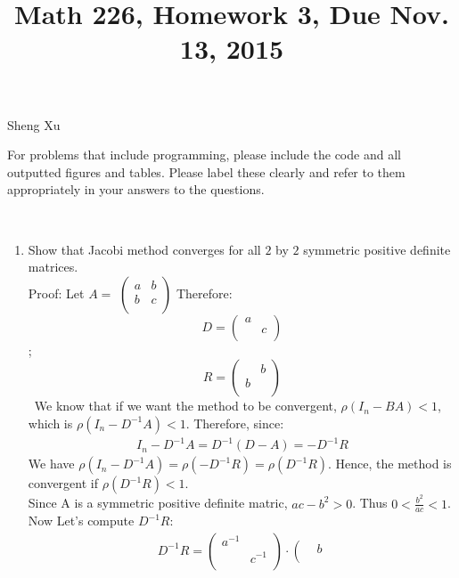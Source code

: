 \documentclass[12pt]{amsart}
\numberwithin{equation}{section}
\numberwithin{table}{section}
\numberwithin{figure}{section}
\numberwithin{algorithm}{section}
\begin{document}
\title[]{Math 226, Homework 3, Due Nov. 13, 2015}
\author{} Sheng Xu

\maketitle


For problems that include programming, please include the code and all outputted figures and tables.  Please label these clearly and refer to them appropriately in your answers to the questions.

\


\begin{enumerate}

\item Show that Jacobi method converges for all $2$ by $2$ symmetric positive definite matrices.\\
Proof: Let $A=$
$\left(
    \begin{array}{ccccc}
	  a & b \\
	  b & c\\
	\end{array}
	\right)$
Therefore:\
$$D=\left(
    \begin{array}{ccccc}
	  a &  \\
	    & c\\
	\end{array}
	\right)$$ ;
$$R=\left(
    \begin{array}{ccccc}
	    & b\\
	  b &  \\
	\end{array}
	\right)$$\
We know that if we want the method to be convergent, $\rho(I_n-BA)<1$, which is $\rho(I_n-D^{-1}A)<1$.
Therefore, since:
\begin{align*}
I_n-D^{-1}A=D^{-1}(D-A)=-D^{-1}R
\end{align*}
We have $\rho(I_n-D^{-1}A)=\rho(-D^{-1}R)=\rho(D^{-1}R)$. Hence, the method is convergent if $\rho(D^{-1}R)<1$.\\
Since A is a symmetric positive definite matric, $ac-b^2>0$. Thus $0<\frac{b^2}{ac}<1$. Now Let's compute $D^{-1}R$:\
\begin{align*}
D^{-1}R
=\left(
    \begin{array}{ccccc}
	  a^{-1} &  \\
	    & c^{-1}\\
	\end{array}
	\right) \cdot
    \left(
    \begin{array}{ccccc}
	    & b \\

\end{array}
\end{align*}
\end{enumerate}
\end{document}
